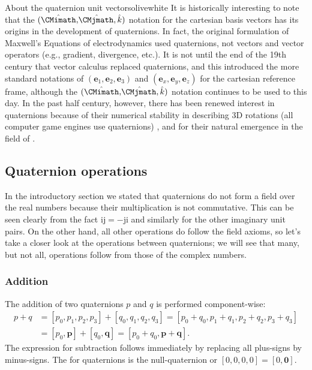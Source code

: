 \begin{messagebox}{About the quaternion unit vectors}{olive}{\icinfo}{white}
It is historically interesting to note that the  $(\hat{\CMimath}, \hat{\mkern-3mu\CMjmath}, \hat{k})$ notation for the cartesian basis vectors has its origins in the development of quaternions.  In fact, the original formulation of Maxwell's Equations of electrodynamics used quaternions, not vectors and vector operators (e.g., gradient, divergence, etc.).  It is not until the end of the 19th century that vector calculus replaced quaternions, and this introduced the more standard notations of $(\mathbf{e}_1,\mathbf{e}_2,\mathbf{e}_3)$ and  $(\mathbf{e}_x,\mathbf{e}_y,\mathbf{e}_z)$ for the cartesian reference frame, although the $(\hat{\CMimath}, \hat{\mkern-3mu\CMjmath}, \hat{k})$ notation continues to be used to this day.  In the past half century, however, there has been renewed interest in quaternions because of their numerical stability  in describing 3D rotations (all computer game engines use quaternions) \cite{xxx}, and for their natural emergence in the field of  \cite{xxx}.
\end{messagebox}


\subsection{Quaternion operations}
In the introductory section we stated that quaternions do not form a field over the real numbers because their multiplication is not commutative.  This can be seen clearly from the fact $\mathrm{i}\mathrm{j}=-\mathrm{j}\mathrm{i}$ and similarly for the other imaginary unit pairs.  On the other hand, all other operations do follow the field axioms, so let's take a closer look at the operations between quaternions; we will see that many, but not all, operations follow from those of the complex numbers.

\subsubsection{Addition}
The addition of two quaternions $p$ and $q$ is performed component-wise:
\begin{equation}
\begin{split}
	p+q &= [p_0,p_1,p_2,p_3]+[q_0,q_1,q_2,q_3]=[p_0+q_0,p_1+q_1,p_2+q_2,p_3+q_3]\\
	 &= [p_0,\mathbf{p}]+[q_0,\mathbf{q}]= [p_0+q_0,\mathbf{p}+\mathbf{q}].
\end{split}
\end{equation}
The expression for subtraction follows immediately by replacing all plus-signs by minus-signs.  The  for quaternions is the null-quaternion or $[0,0,0,0]=[0,\mathbf{0}]$.

